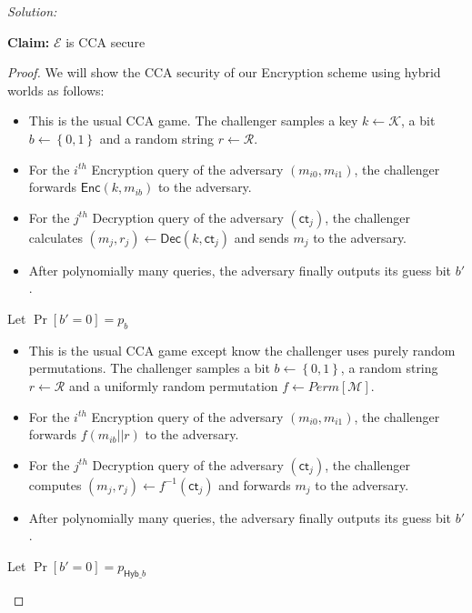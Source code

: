 \documentclass[a4paper, 11pt]{article}
\newenvironment{solution}
    {\textit{Solution:}}
    {\clearpage}
\newcommand{\bit}{\left\{0, 1\right\}}
\newcommand{\ct}{\mathsf{ct}}
\newcommand{\hyb}{\mathsf{Hyb}}
\newcommand{\enc}{\mathsf{Enc}}
\newcommand{\dec}{\mathsf{Dec}}
\newcommand{\calE}{\mathcal{E}}
\newcommand{\calK}{\mathcal{K}}
\newcommand{\calM}{\mathcal{M}}
\newcommand{\calR}{\mathcal{R}}
\begin{document}
\begin{solution}
\begin{enumerate}[(a)]
              \textbf{Claim:} $\calE$ is CCA secure
              \begin{proof}
                  We will show the CCA security of our Encryption scheme using hybrid worlds as follows:
                  \begin{world}[World-b]
                      \begin{itemize}
                          \item This is the usual CCA game. The challenger samples a key $k \leftarrow \calK$, a bit $b \leftarrow \bit$ and a random string $r \leftarrow \calR$.
                          \item For the $i^{th}$ Encryption query of the adversary $(m_{i0}, m_{i1})$, the challenger forwards $\enc(k, m_{ib})$ to the adversary.
                          \item For the $j^{th}$ Decryption query of the adversary $(\ct_{j})$, the challenger calculates $(m_j, r_j) \leftarrow \dec(k, \ct_j)$ and sends $m_j$ to the adversary.
                          \item After polynomially many queries, the adversary finally outputs its guess bit $b'$.
                      \end{itemize}
                      Let $\Pr[b' = 0] = p_b$
                  \end{world}

                  \begin{world}
                      \begin{itemize}
                          \item This is the usual CCA game except know the challenger uses purely random permutations. The challenger samples a bit $b \leftarrow \bit$, a random string $r \leftarrow \calR$ and a uniformly random permutation $f \leftarrow Perm[\calM]$.
                          \item For the $i^{th}$ Encryption query of the adversary $(m_{i0}, m_{i1})$, the challenger forwards $f(m_{ib}||r)$ to the adversary.
                          \item For the $j^{th}$ Decryption query of the adversary $(\ct_{j})$, the challenger computes $(m_j, r_j) \leftarrow f^{-1}(\ct_j)$ and forwards $m_j$ to the adversary.
                          \item After polynomially many queries, the adversary finally outputs its guess bit $b'$.
                      \end{itemize}
                      Let $\Pr[b' = 0] = p_{\hyb\_b}$
                  \end{world}


\end{proof}
\end{enumerate}
\end{solution}
\end{document}
